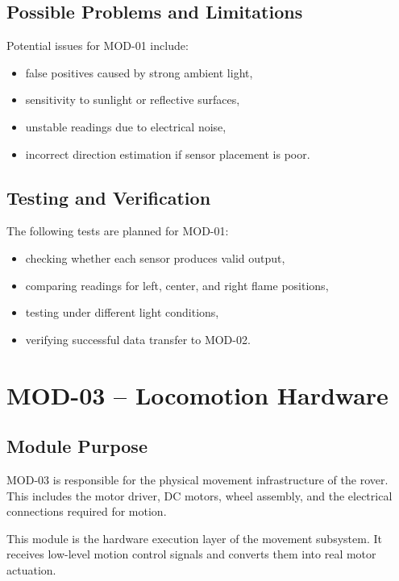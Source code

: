 \documentclass[12pt,a4paper]{article}
\begin{document}
\subsection{Possible Problems and Limitations}

Potential issues for MOD-01 include:

\begin{itemize}[leftmargin=1.2cm]
    \item false positives caused by strong ambient light,
    \item sensitivity to sunlight or reflective surfaces,
    \item unstable readings due to electrical noise,
    \item incorrect direction estimation if sensor placement is poor.
\end{itemize}

\subsection{Testing and Verification}

The following tests are planned for MOD-01:

\begin{itemize}[leftmargin=1.2cm]
    \item checking whether each sensor produces valid output,
    \item comparing readings for left, center, and right flame positions,
    \item testing under different light conditions,
    \item verifying successful data transfer to MOD-02.
\end{itemize}

\section{MOD-03 -- Locomotion Hardware}

\subsection{Module Purpose}

MOD-03 is responsible for the physical movement infrastructure of the rover. This includes the motor driver, DC motors, wheel assembly, and the electrical connections required for motion.

This module is the hardware execution layer of the movement subsystem. It receives low-level motion control signals and converts them into real motor actuation.
\end{document}
